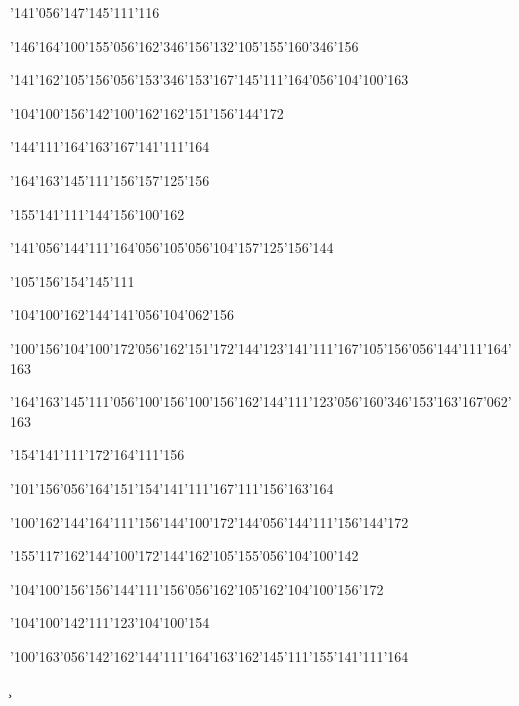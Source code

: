 \null\vfill\ipa\centerline{\enskip\enskip\enskip\enskip\enskip\enskip\enskip\char'141\char'056\char'147\char'145\char'111\char'116}\medskip\centerline{\enskip\char'146\char'164\char'100\char'155\char'056\char'162\char'346\char'156\enskip\enskip\enskip\char'132\char'105\char'155\enskip\enskip\enskip\char'160\char'346\char'156}\medskip\centerline{\enskip\char'141\enskip\char'162\char'105\char'156\char'056\char'153\char'346\char'153\enskip\char'167\char'145\char'111\char'164\char'056\char'104\char'100\char'163}\medskip\centerline{\enskip\char'104\char'100\char'156\enskip\enskip\char'142\char'100\char'162\enskip\char'162\char'151\char'156\char'144\char'172}\medskip\centerline{\enskip\enskip\enskip\char'144\char'111\char'164\enskip\enskip\enskip\enskip\char'163\char'167\char'141\char'111\char'164}\medskip\centerline{\enskip\enskip\enskip\enskip\char'164\char'163\char'145\char'111\enskip\enskip\enskip\enskip\char'156\char'157\char'125\char'156\enskip\enskip\enskip\enskip}\medskip\centerline{\enskip\enskip\enskip\enskip\char'155\char'141\char'111\char'144\enskip\enskip\enskip\enskip\char'156\char'100\char'162}\medskip\centerline{\enskip\char'141\char'056\char'144\char'111\char'164\char'056\char'105\char'056\char'104\char'157\char'125\char'156\char'144\enskip\enskip\enskip\enskip\enskip\enskip\enskip}\medskip\centerline{\enskip\char'105\char'156\enskip\char'154\char'145\char'111\enskip\enskip\enskip\enskip\enskip\enskip\enskip}\medskip\centerline{\enskip\enskip\enskip\enskip\enskip\char'104\char'100\char'162\char'144\enskip\char'141\char'056\char'104\char'062\char'156\enskip\enskip\enskip\enskip\enskip\enskip\enskip\enskip\enskip\enskip}\medskip\centerline{\enskip\char'100\char'156\enskip\char'104\char'100\char'172\char'056\char'162\char'151\char'172\char'144\enskip\char'123\char'141\char'111\enskip\char'167\char'105\char'156\char'056\char'144\char'111\char'164\char'163}\medskip\centerline{\enskip\char'164\char'163\char'145\char'111\char'056\char'100\char'156\enskip\char'100\char'156\enskip\enskip\enskip\char'162\char'144\char'111\char'123\char'056\char'160\char'346\char'153\enskip\char'163\char'167\char'062\char'163}\medskip\centerline{\enskip\enskip\enskip\enskip\char'154\char'141\char'111\char'172\enskip\enskip\enskip\enskip\char'164\char'111\char'156}\medskip\centerline{\enskip\char'101\char'156\char'056\char'164\char'151\enskip\char'154\char'141\char'111\enskip\char'167\char'111\char'156\char'163\char'164}\medskip\centerline{\enskip\char'100\char'162\char'144\enskip\char'164\char'111\char'156\char'144\enskip\enskip\enskip\enskip\char'100\char'172\char'144\char'056\char'144\char'111\char'156\char'144\char'172}\medskip\centerline{\enskip\char'155\char'117\char'162\char'144\enskip\char'100\char'172\char'144\enskip\char'162\char'105\char'155\char'056\char'104\char'100\char'142}\medskip\centerline{\enskip\char'104\char'100\char'156\enskip\char'156\char'144\char'111\char'156\char'056\char'162\char'105\char'162\enskip\char'104\char'100\char'156\char'172}\medskip\centerline{\enskip\char'104\char'100\char'142\enskip\char'111\char'123\enskip\char'104\char'100\char'154\enskip\enskip\enskip\enskip}\medskip\centerline{\enskip\char'100\char'163\char'056\char'142\char'162\char'144\char'111\char'164\char'163\enskip\char'162\char'145\char'111\enskip\char'155\char'141\char'111\char'164}\medskip\c